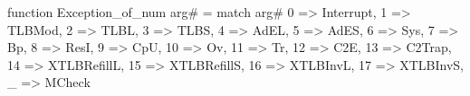 function Exception_of_num arg# = match arg# {
  0 => Interrupt,
  1 => TLBMod,
  2 => TLBL,
  3 => TLBS,
  4 => AdEL,
  5 => AdES,
  6 => Sys,
  7 => Bp,
  8 => ResI,
  9 => CpU,
  10 => Ov,
  11 => Tr,
  12 => C2E,
  13 => C2Trap,
  14 => XTLBRefillL,
  15 => XTLBRefillS,
  16 => XTLBInvL,
  17 => XTLBInvS,
  _ => MCheck
}
